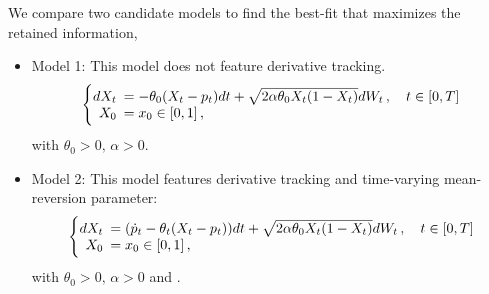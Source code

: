\documentclass[11pt]{article}
\theoremstyle{definition}
\begin{document}
We compare two candidate models to find the best-fit that maximizes the retained information,
\begin{itemize}
  \item Model 1: This model does not feature derivative tracking.
\begin{equation}
  \left\{
  \begin{array}{@{}rl@{}}
    dX_t \!\!\!&=  - \theta_0 (X_t - p_t) dt +\sqrt{2 \alpha \theta_0 X_t (1 - X_t)} dW_t\,, \quad t \in [0,T]  \\
   X_0  \!\!\!&=  x_0\in [0,1] \,,
 \end{array}\right.  \label{Model1}
\end{equation}
 with $\theta_0 > 0, \, \alpha > 0$.

%  

  \item Model 2: This model features derivative tracking and time-varying mean-reversion parameter:  
\begin{equation}
  \left\{
  \begin{array}{@{}rl@{}}
    dX_t \!\!\!&= (\dot{p}_t  - \theta_t (X_t - p_t) ) dt +\sqrt{2 \alpha \theta_0 X_t (1 - X_t)} dW_t\,, \quad t \in [0,T]  \\
   X_0  \!\!\!&=  x_0\in [0,1] \,,
 \end{array}\right.  \label{Model2}
\end{equation}
 with $\theta_0 > 0, \, \alpha > 0$ and .
\end{itemize}
\end{document}
